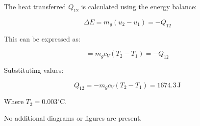 The heat transferred \( Q_{12} \) is calculated using the energy balance:  

\[
\Delta E = m_g (u_2 - u_1) = -Q_{12}
\]

This can be expressed as:  

\[
= m_g c_V (T_2 - T_1) = -Q_{12}
\]

Substituting values:  

\[
Q_{12} = -m_g c_V (T_2 - T_1) = 1674.3 \, \text{J}
\]

Where \( T_2 = 0.003^\circ\text{C} \).  

No additional diagrams or figures are present.
